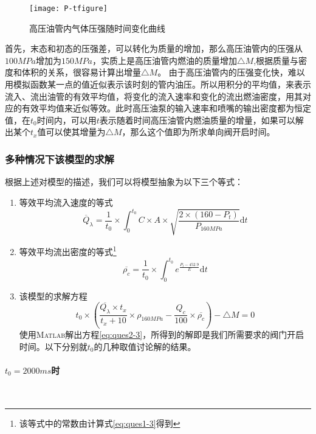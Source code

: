 \documentclass{cumcmthesis}
\begin{document}
\begin{figure}[!h]
	\centering 
	\texttt{[image: P-tfigure]}
	\caption{高压油管内气体压强随时间变化曲线}
	\label{fig:f(t)-picture}
\end{figure}
\newpage
首先，末态和初态的压强差，可以转化为质量的增加，那么高压油管内的压强从${100MPa}$增加为${150MPa}$，实质上是高压油管内燃油的质量增加${\triangle M}$,根据质量与密度和体积的关系，很容易计算出增量${\triangle M}$。
由于高压油管内的压强变化快，难以用模拟函数某一点的值近似表示该时刻的管内油压。所以用积分的平均值，来表示流入、流出油管的有效平均值，将变化的流入速率和变化的流出燃油密度，用其对应的有效平均值来近似等效。此时高压油泵的输入速率和喷嘴的输出密度都为恒定值，在$t_{0}$时间内，可以用$t$表示随着时间高压油管内燃油质量的增量，如果可以解出某个$t_{x}$值可以使其增量为${\triangle M}$，那么这个值即为所求单向阀开启时间。
\subsubsection{多种情况下该模型的求解}
根据上述对模型的描述，我们可以将模型抽象为以下三个等式：
\begin{enumerate}
	\item 等效平均流入速度的等式
	\begin{equation*}
	\overline{Q}_{\lambda} = \frac{1}{t_{0}}\times \int_{0}^{t_{0}} C\times A\times \sqrt{\frac{2\times (160-P_{t})}{P_{160MPa}}}{\text{d}t}\label{eq:ques2-1}	
	\end{equation*}
	\item 等效平均流出密度的等式\footnote{该等式中的常数由计算式\cref{eq:ques1-3}得到}
	\begin{equation*}
	\overline{\rho_{c}} = \frac{1}{t_{0}}\times \int_{0}^{t_{0}} e^{\frac{P_{t}-452.9}{E}}{\text{d}t}\label{eq:ques2-2}	
	\end{equation*}
	\item 该模型的求解方程
	\begin{equation}
	t_{0}\times(\frac{\overline{Q_{\lambda}}\times t_{x}}{t_{x}+10}\times \rho_{160MPa}-\frac{Q_{c}}{100}\times \overline{\rho_{c}})-\triangle M = 0\label{eq:ques2-3}	
	\end{equation}
	使用\textsc{Matlab}解出方程\cref{eq:ques2-3}，所得到的解即是我们所需要求的阀门开启时间。以下分别就$t_{0}$的几种取值讨论解的结果。
\end{enumerate}
\paragraph{$t_{0}=2000ms$时}~{}
\end{document}
